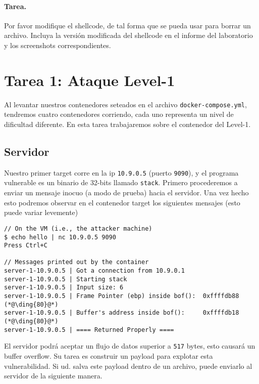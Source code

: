 \paragraph{Tarea.} Por favor modifique el shellcode, de tal forma que se pueda usar para borrar un archivo. Incluya la versión modificada del shellcode en el informe del laboratorio y los screenshots correspondientes.



\section{Tarea 1: Ataque Level-1} 

Al levantar nuestros contenedores seteados en el archivo \texttt{docker-compose.yml}, tendremos cuatro contenedores corriendo, cada uno representa un nivel de dificultad diferente.
En esta tarea trabajaremos sobre el contenedor del Level-1.


\subsection{Servidor} 

Nuestro primer target corre en la ip \texttt{10.9.0.5} (puerto \texttt{9090}), y el programa vulnerable es un binario de 32-bits llamado \texttt{stack}.
Primero procederemos a enviar un mensaje inocuo (a modo de prueba) hacia el servidor.
Una vez hecho esto podremos observar en el contenedor target los siguientes mensajes (esto puede variar levemente)

\begin{lstlisting}
// On the VM (i.e., the attacker machine)
$ echo hello | nc 10.9.0.5 9090
Press Ctrl+C

// Messages printed out by the container
server-1-10.9.0.5 | Got a connection from 10.9.0.1
server-1-10.9.0.5 | Starting stack
server-1-10.9.0.5 | Input size: 6
server-1-10.9.0.5 | Frame Pointer (ebp) inside bof():  0xffffdb88    (*@\ding{80}@*)
server-1-10.9.0.5 | Buffer's address inside bof():     0xffffdb18    (*@\ding{80}@*)
server-1-10.9.0.5 | ==== Returned Properly ====
\end{lstlisting}

El servidor podrá aceptar un flujo de datos superior a \texttt{517} bytes, esto causará un buffer overflow. Su tarea es construir un payload para explotar esta vulnerabilidad. Si ud. salva este payload dentro de un archivo, puede enviarlo al servidor de la siguiente manera.

